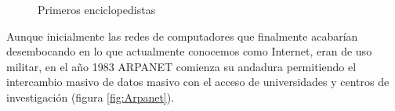 \begin{figure}[hbtp]
\centering
{}
\hspace{20mm}
\caption{Primeros enciclopedistas}
\label{fig:Introduccion_enciclopedistas}
\end{figure}

Aunque inicialmente las redes de computadores que finalmente acabarían desembocando en lo que actualmente conocemos como Internet, eran de uso militar, en el año 1983 ARPANET comienza su andadura permitiendo el intercambio masivo de datos masivo con el acceso de universidades y centros de investigación (figura \ref{fig:Arpanet}).%

